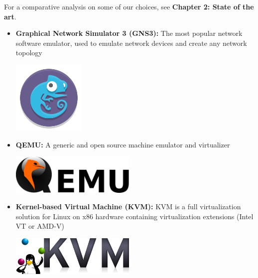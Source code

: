 \medskip
For a comparative analysis on some of our choices, see \textbf {Chapter 2: State of the art}.

\begin{itemize}
    \item \textbf{Graphical Network Simulator 3 (GNS3):} \newline The most popular network software emulator, used to emulate network devices and create any network topology \newline
          \begin{minipage}{\linewidth}
              \centering
              \includegraphics[width=3.5cm]{src/assets/logos/gns3_94911_500x500.png}
          \end{minipage}
    \item \textbf{QEMU:} \newline \cite{qemu} A generic and open source machine emulator and virtualizer \newline \newline
          \begin{minipage}{\linewidth}
              \centering
              \includegraphics[width=6cm]{src/assets/logos/qemu_logo.png}
          \end{minipage}
          \newline
    \item \textbf{Kernel-based Virtual Machine (KVM):} \newline \cite{kvm} KVM is a full virtualization solution for Linux on x86 hardware containing virtualization extensions (Intel VT or AMD-V) \newline \newline
          \begin{minipage}{\linewidth}
              \centering
              \includegraphics[width=6cm]{src/assets/logos/kvm_banner_logo.png}
          \end{minipage}
          \newpage


\end{itemize}
